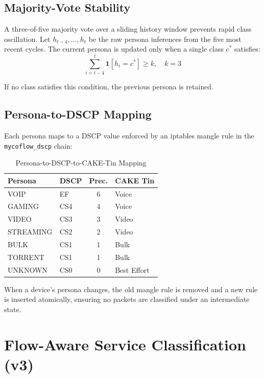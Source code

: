 \subsection{Majority-Vote Stability}

A three-of-five majority vote over a sliding history window prevents rapid class oscillation. Let $h_{t-4}, \ldots, h_t$ be the raw persona inferences from the five most recent cycles. The current persona is updated only when a single class $c^*$ satisfies:
\begin{equation}
  \sum_{i=t-4}^{t} \mathbf{1}[h_i = c^*] \geq k, \quad k = 3
  \label{eq:majority}
\end{equation}

If no class satisfies this condition, the previous persona is retained.

\subsection{Persona-to-DSCP Mapping}

Each persona maps to a DSCP value enforced by an iptables mangle rule in the \texttt{mycoflow\_dscp} chain:

\begin{table}[h]
\caption{Persona-to-DSCP-to-CAKE-Tin Mapping}
\label{tab:dscpmap}
\centering
\small
\begin{tabular}{llcl}
\toprule
\textbf{Persona} & \textbf{DSCP} & \textbf{Prec.} & \textbf{CAKE Tin} \\
\midrule
VOIP      & EF   & 6 & Voice       \\
GAMING    & CS4  & 4 & Voice       \\
VIDEO     & CS3  & 3 & Video       \\
STREAMING & CS2  & 2 & Video       \\
BULK      & CS1  & 1 & Bulk        \\
TORRENT   & CS1  & 1 & Bulk        \\
UNKNOWN   & CS0  & 0 & Best Effort \\
\bottomrule
\end{tabular}
\end{table}

When a device's persona changes, the old mangle rule is removed and a new rule is inserted atomically, ensuring no packets are classified under an intermediate state.

\section{Flow-Aware Service Classification (v3)}

